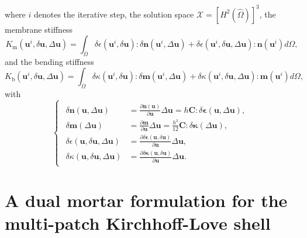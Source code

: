 where $i$ denotes the iterative step, the solution space $\boldsymbol{\mathcal{X}}=\left[H^2(\hat{\Omega})\right]^3$, the membrane stiffness
\begin{equation}
	K_\text{m}(\mathbf{u}^i,\delta\mathbf{u},\Delta\mathbf{u}) = \int_{\overline{\Omega}} \delta{\epsilon(\mathbf{u}^{i},\delta\mathbf{u})} \colon \delta\mathbf{n}(\mathbf{u}^i,{\Delta}\mathbf{u}) + \delta{\epsilon(\mathbf{u}^{i},\delta\mathbf{u},\Delta\mathbf{u})} \colon \mathbf{n}(\mathbf{u}^i) d\Omega,
\end{equation}
and the bending stiffness
\begin{equation}
	K_\text{b}(\mathbf{u}^i,\delta\mathbf{u},\Delta\mathbf{u}) = \int_{\overline{\Omega}} \delta{\kappa(\mathbf{u}^{i},\delta\mathbf{u})} \colon \delta\mathbf{m}(\mathbf{u}^i,{\Delta}\mathbf{u}) + \delta{\kappa(\mathbf{u}^{i},\delta\mathbf{u},\Delta\mathbf{u})} \colon \mathbf{m}(\mathbf{u}^i) d\Omega,
\end{equation}
with
\begin{equation}
	\begin{cases}
		\begin{aligned}
			\delta{\mathbf{n}(\mathbf{u},{\Delta}\mathbf{u})}              & = \frac{\partial \mathbf{n}(\mathbf{u})}{\partial \mathbf{u}}{\Delta}\mathbf{u} = h\mathbf{C}\colon \delta\mathbf{\epsilon}(\mathbf{u},\Delta\mathbf{u}), \\
			\delta{\mathbf{m}({\Delta}\mathbf{u})}                         & = \frac{\partial \mathbf{m}}{\partial \mathbf{u}}{\Delta}\mathbf{u} = \frac{h^3}{12}\mathbf{C}\colon \delta\mathbf{\kappa}(\Delta\mathbf{u}),             \\
			\delta{\epsilon(\mathbf{u},\delta\mathbf{u},\Delta\mathbf{u})} & = \frac{\partial \delta\mathbf{\epsilon}(\mathbf{u},\delta\mathbf{u})}{\partial \mathbf{u}}\Delta\mathbf{u},                                              \\
			\delta{\kappa(\mathbf{u},\delta\mathbf{u},\Delta\mathbf{u})}   & = \frac{\partial \delta\mathbf{\kappa}(\mathbf{u},\delta\mathbf{u})}{\partial \mathbf{u}}\Delta\mathbf{u}.
		\end{aligned}
	\end{cases}
\end{equation}

\section{A dual mortar formulation for the multi-patch Kirchhoff-Love shell}\label{sec:multi_patch}

